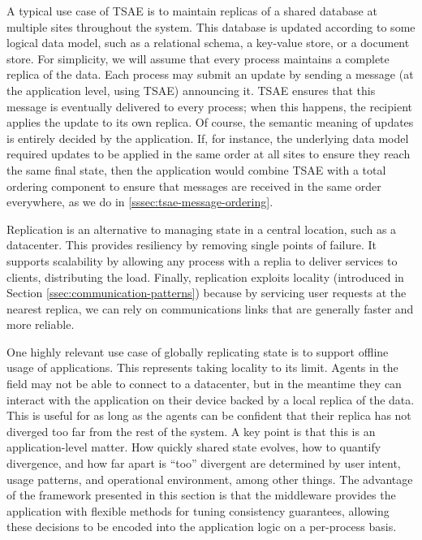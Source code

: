 \documentclass[]             %
{NASA}                       %
\theoremstyle{definition}
\begin{document}
A typical use case of TSAE is to maintain replicas of a shared
database at multiple sites throughout the system. This database is
updated according to some logical data model, such as a relational
schema, a key-value store, or a document store. For simplicity, we
will assume that every process maintains a complete replica of the
data. Each process may submit an update by sending a message (at the
application level, using TSAE) announcing it. TSAE ensures that this
message is eventually delivered to every process; when this happens,
the recipient applies the update to its own replica. Of course, the
semantic meaning of updates is entirely decided by the
application. If, for instance, the underlying data model required
updates to be applied in the same order at all sites to ensure they
reach the same final state, then the application would combine TSAE
with a total ordering component to ensure that messages are received
in the same order everywhere, as we do in
\ref{sssec:tsae-message-ordering}.

Replication is an alternative to managing state in a central location,
such as a datacenter. This provides resiliency by removing single
points of failure. It supports scalability by allowing any process
with a replia to deliver services to clients, distributing the
load. Finally, replication exploits locality (introduced in Section
\ref{ssec:communication-patterns}) because by servicing user requests
at the nearest replica, we can rely on communications links that are
generally faster and more reliable.

One highly relevant use case of globally replicating state is to
support offline usage of applications. This represents taking locality
to its limit. Agents in the field may not be able to connect to a
datacenter, but in the meantime they can interact with the application
on their device backed by a local replica of the data. This is useful
for as long as the agents can be confident that their replica has not
diverged too far from the rest of the system. A key point is that this
is an application-level matter. How quickly shared state evolves, how
to quantify divergence, and how far apart is ``too'' divergent are
determined by user intent, usage patterns, and operational
environment, among other things. The advantage of the framework
presented in this section is that the middleware provides the
application with flexible methods for tuning consistency guarantees,
allowing these decisions to be encoded into the application logic on a
per-process basis.
\end{document}

